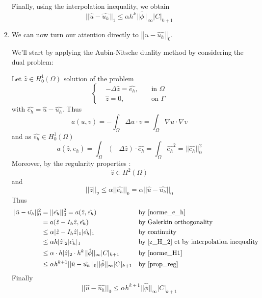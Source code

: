 \begin{enumerate}[label=\textbullet]
	Finally, using the interpolation inequality, we obtain
	\begin{equation}
		||\hat{u}-\hat{u_h}||_1\le\alpha h^k ||\hat{\phi}||_\infty |C|_{k+1}
		\label{norme_H1}
	\end{equation} 
	
	\item We can now turn our attention directly to $\left|\left|\hat{u}-\hat{u_h}\right|\right|_0$.
	
	We'll start by applying the Aubin-Nitsche duality method by considering the dual problem:
	
	Let $\hat{z}\in H_0^1(\Omega)$ solution of the problem
	$$\left\{\begin{aligned}
		&-\Delta\hat{z}=\hat{e_h}, \; &&\text{in }\Omega \\
		&\hat{z}=0, \; &&\text{on } \Gamma
	\end{aligned}\right.$$
	with $\hat{e_h}=\hat{u}-\hat{u_h}$.
	Thus
	$$a(u,v)=-\int_\Omega\Delta u\cdot v=\int_\Omega\nabla u\cdot\nabla v$$
	and as $\hat{e_h}\in H_0^1(\Omega)$
	\begin{equation}
		a(\hat{z},\hat{e_h})=\int_\Omega(-\Delta \hat{z})\cdot \hat{e_h}=\int_\Omega \hat{e_h}^2=||\hat{e_h}||_0^2
		\label{norme_e_h}
	\end{equation}
	Moreover, by the regularity properties : 
	\begin{equation}
		\hat{z}\in H^2(\Omega)
		\label{z_H_2}
	\end{equation}
	and
	\begin{equation}
		||\hat{z}||_2\le \alpha||\hat{e_h}||_0 =\alpha||\hat{u}-\hat{u_h}||_0
		\label{prop_reg}
	\end{equation}
\newpage
	Thus
	\begin{align*}
		||\hat{u}-\hat{u_h}||_0^2&=||\hat{e_h}||_0^2=a(\hat{z},\hat{e_h}) &&\text{by \ref{norme_e_h}} \\
		&=a(\hat{z}-I_h\hat{z},\hat{e_h}) &&\text{by Galerkin orthogonality} \\
		&\le\alpha|\hat{z}-I_h\hat{z}|_1|\hat{e_h}|_1 &&\text{by continuity} \\
		&\le\alpha h|\hat{z}|_2|\hat{e_h}|_1 &&\text{by \ref{z_H_2} et by interpolation inequality} \\
		&\le\alpha \cdot h|\hat{z}|_2 \cdot h^k||\hat{\phi}||_\infty |C|_{k+1} &&\text{by \ref{norme_H1}} \\
		&\le\alpha h^{k+1}||\hat{u}-\hat{u_h}||_0||\hat{\phi}||_\infty |C|_{k+1} &&\text{by \ref{prop_reg}}
	\end{align*}
	Finally
	\begin{equation*}
		||\hat{u}-\hat{u_h}||_0\le\alpha h^{k+1}||\hat{\phi}||_\infty |C|_{k+1}
	\end{equation*}
	

\end{enumerate}
